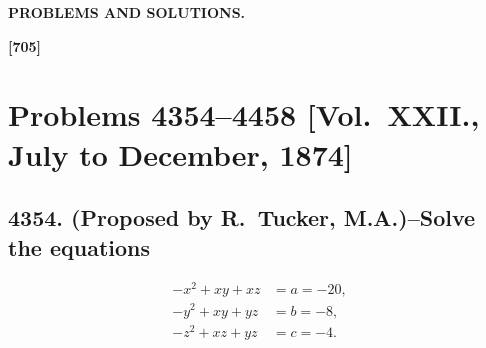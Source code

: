 \documentclass[11pt,a4paper]{book}
\begin{document}
\begin{center}
\Large\bfseries
PROBLEMS AND SOLUTIONS.
\end{center}

\thispagestyle{empty}

\vspace{1em}

\noindent\textbf{[705]}

\section*{Problems 4354--4458 [Vol.~XXII., July to December, 1874]}

\subsection*{4354. (Proposed by R.~Tucker, M.A.)\---Solve the equations}

\begin{align}
-x^2 + xy + xz &= a = -20, \\
-y^2 + xy + yz &= b = -8, \\
-z^2 + xz + yz &= c = -4.
\end{align}
\end{document}
